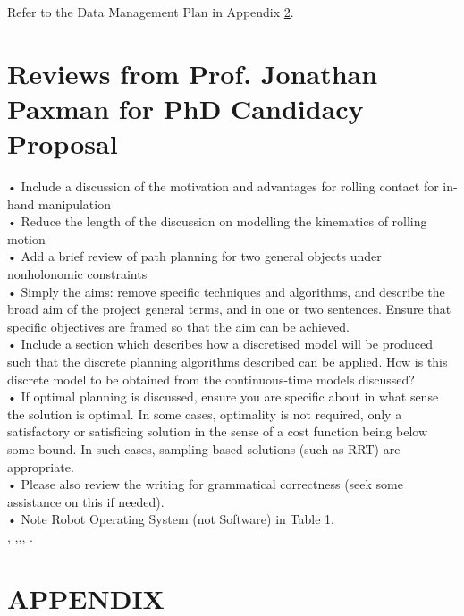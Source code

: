 \documentclass[a4paper]{article}
\begin{document}
\newpage
Refer to the Data Management Plan in Appendix \ref{appendix:A}.

%
%
%
%
%
%
\cite{Barraquand91_MP_DisctributedRepresenation}

\newpage
\section{Reviews from Prof. Jonathan Paxman for PhD Candidacy Proposal}
• Include a discussion of the motivation and advantages for rolling contact for in-hand manipulation\\
•	Reduce the length of the discussion on modelling the kinematics of rolling motion\\
•	Add a brief review of path planning for two general objects under nonholonomic constraints\\
•	Simply the aims: remove specific techniques and algorithms, and describe the broad aim of the project general terms, and in one or two sentences. Ensure that specific objectives are framed so that the aim can be achieved.\\
•	Include a section which describes how a discretised model will be produced such that the discrete planning algorithms described can be applied. How is this discrete model to be obtained from the continuous-time models discussed?\\
•	If optimal planning is discussed, ensure you are specific about in what sense the solution is optimal. In some cases, optimality is not required, only a satisfactory or satisficing solution in the sense of a cost function being below some bound. In such cases, sampling-based solutions (such as RRT) are appropriate.\\
•	Please also review the writing for grammatical correctness (seek some assistance on this if needed).\\
•	Note Robot Operating System (not Software) in Table 1.\\

\cite{Antonio04_NewPRM},
\cite{Kavraki02_Random_ConfigurationSpace_PP},\cite{Cai87_SpatialMotion_PointContact},\cite{Holland75_GAMethod},
\cite{Alouges10_MotionPlanning_RollingBody}.




\cleardoublepage
\normalem
\printbibliography 

%
%


\cleardoublepage
\appendix
\section{APPENDIX}
\label{appendix:A}
%
%
\end{document}
